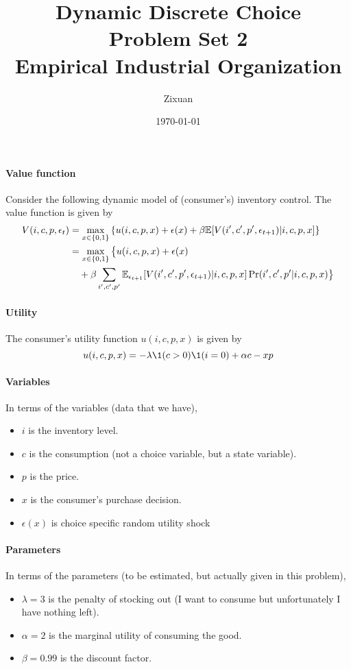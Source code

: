 \documentclass[12pt]{article}[margin=1in]
\title{\textbf{Dynamic Discrete Choice} \\
\vspace{.3cm}
\large Problem Set 2 \\
Empirical Industrial Organization}
\author{Zixuan}
\date{\today}
\begin{document}
\maketitle

\setcounter{page}{1}

\paragraph{Value function} Consider the following dynamic model of (consumer's) inventory control. The
value function is given by
\begin{equation*}
    \begin{split}
        V(i,c,p,\epsilon_t) & = \max_{x \in \{0,1\}} \left\{ u(i,c,p,x) + \epsilon(x)+ \beta \mathbb{E}[V(i',c',p',\epsilon_{t+1})|i,c,p,x] \right\}     \\
                            & = \max_{x \in \{0,1\}} \big\{ u(i,c,p,x) + \epsilon(x)                                                             \\
                            & \quad + \beta \sum_{i',c',p'}\mathbb{E}_{\epsilon_{t+1}}[V(i',c',p',\epsilon_{t+1})|i,c,p,x] \Pr(i', c',p'|i,c,p,x) \big\}
    \end{split}
\end{equation*}
\paragraph{Utility} The consumer's utility function $u(i,c,p,x)$ is given by
\begin{equation*}
    u(i,c,p,x) = -\lambda \1(c>0)\1(i=0) + \alpha c -xp
\end{equation*}
\paragraph{Variables} In terms of the variables (data that we have),
\begin{itemize}
    \item $i$ is the inventory level.
    \item $c$ is the consumption (not a choice variable, but a state variable).
    \item $p$ is the price.
    \item $x$ is the consumer's purchase decision.
    \item $\epsilon(x)$ is choice specific random utility shock
\end{itemize}
\paragraph{Parameters} In terms of the parameters (to be estimated, but actually given in this
problem),
\begin{itemize}
    \item $\lambda=3$ is the penalty of stocking out (I want to consume but unfortunately I have nothing left).
    \item $\alpha=2$ is the marginal utility of consuming the good.
    \item $\beta=0.99$ is the discount factor.
\end{itemize}
\end{document}
